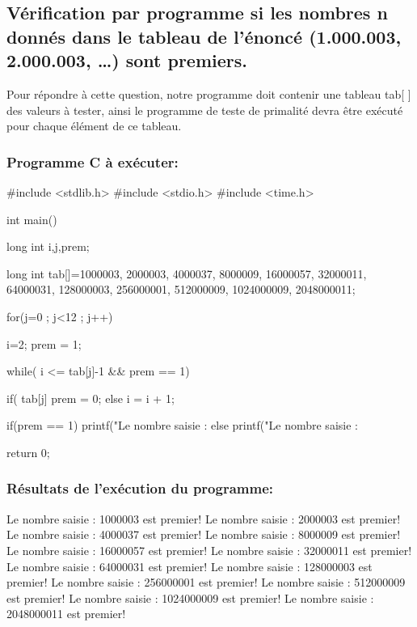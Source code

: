 \documentclass[12pt]{article}
\begin{document}
\subsection{Vérification par programme  si  les  nombres  n  donnés  dans  le tableau de l'énoncé (1.000.003, 2.000.003, …) sont premiers.}

Pour répondre à cette question, notre programme doit contenir une tableau tab[ ] des valeurs à tester, ainsi le programme de teste de primalité devra être exécuté pour chaque élément de ce tableau.

\subsubsection{Programme C à exécuter:}

\begin{sql}
#include <stdlib.h>
#include <stdio.h>
#include <time.h>

int main()
{
	long int i,j,prem;

	long int tab[]={1000003, 2000003, 4000037, 8000009, 16000057, 32000011, 64000031, 128000003, 256000001, 512000009,	1024000009,	2048000011};

for(j=0 ; j<12 ; j++)
{
	i=2;
	prem = 1;
	
	while( i <= tab[j]-1 && prem == 1){

		if( tab[j]%
			prem = 0;
		else
			i = i + 1;
	}

	if(prem == 1)
    {
        printf("Le nombre saisie : %
    }
	else{
        printf("Le nombre saisie : %
	}
}

return 0;
}
\end{sql}

\subsubsection{Résultats de l'exécution du programme:}
\begin{sql}
Le nombre saisie : 1000003 est premier!
Le nombre saisie : 2000003 est premier!
Le nombre saisie : 4000037 est premier!
Le nombre saisie : 8000009 est premier!
Le nombre saisie : 16000057 est premier!
Le nombre saisie : 32000011 est premier!
Le nombre saisie : 64000031 est premier!
Le nombre saisie : 128000003 est premier!
Le nombre saisie : 256000001 est premier!
Le nombre saisie : 512000009 est premier!
Le nombre saisie : 1024000009 est premier!
Le nombre saisie : 2048000011 est premier!
\end{sql}
\end{document}
